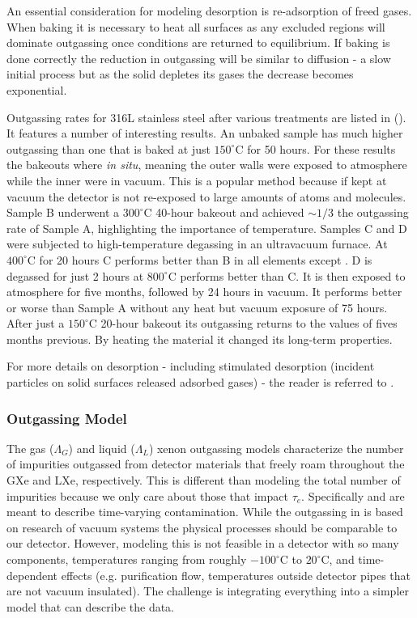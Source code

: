 An essential consideration for modeling desorption is re-adsorption of freed gases.  When baking it is necessary to heat all surfaces as
any excluded regions will dominate outgassing once conditions are returned to equilibrium.  If baking is done correctly the reduction in
outgassing will be similar to diffusion - a slow initial process but as the solid depletes its gases the decrease becomes
exponential.

Outgassing rates for 316L stainless steel after various treatments are listed in
 ().  It features a number of interesting
results.  An unbaked sample has
much higher outgassing than one that is baked at just $150^{\circ}\mathrm{C}$ for 50 hours.  For these results the bakeouts where
\textit{in situ}, meaning the outer walls were exposed to atmosphere while the inner were in vacuum.  This is a popular method because
if kept at vacuum the detector is not re-exposed to large amounts of atoms and molecules.  Sample B underwent a $300^{\circ}\mathrm{C}$
40-hour bakeout and achieved ${\sim} 1/3$ the outgassing rate of Sample A, highlighting the importance of temperature.  Samples C and D
were subjected to high-temperature degassing in an ultravacuum furnace.  At $400^{\circ}\mathrm{C}$ for 20 hours C performs better than B
in all elements except .  D is degassed for just 2 hours at $800^{\circ}\mathrm{C}$ performs better than C.  It is then exposed
to atmosphere for five months, followed by 24 hours in vacuum.  It performs better or worse than Sample A without any heat but vacuum
exposure of 75 hours.  After just a $150^{\circ}\mathrm{C}$ 20-hour bakeout its outgassing returns to the values of fives months
previous.  By heating the material it changed its long-term properties.

For more details on desorption - including stimulated desorption (incident particles on solid surfaces released adsorbed gases) - the
reader is referred to .



\subsubsection{Outgassing Model}
\label{subsubsec:electron_lifetime_model_outgassing_model}
The gas ($\Lambda_G$) and liquid ($\Lambda_L$) xenon outgassing models characterize the number of impurities outgassed from detector
materials that freely roam throughout
the GXe and LXe, respectively.  This is different than modeling the total number of impurities because we only care about those
that impact $\tau_e$.  Specifically \outg and \outl are meant to describe time-varying contamination.  While the outgassing in
 is based on research of vacuum systems the physical processes should be
comparable to our detector.  However, modeling this is not feasible in a detector with so
many components, temperatures ranging from roughly $-100^{\circ} \mathrm{C}$ to $20^{\circ} \mathrm{C}$, and time-dependent effects (e.g.
purification flow, temperatures outside detector pipes that are not vacuum insulated).  The challenge is integrating everything into
a simpler model that can describe the data.

